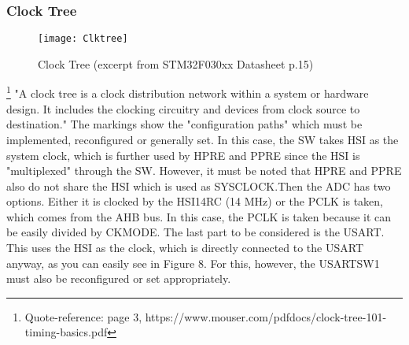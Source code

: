 \documentclass[11pt]{scrartcl}
\begin{document}
	\subsubsection{Clock Tree}
\begin{figure}[h]
		\centering
		\texttt{[image: Clktree]}
		\caption{Clock Tree (excerpt from STM32F030xx Datasheet p.15)}
\end{figure}	
\footnote{\label{foot:13}Quote-reference: page 3, https://www.mouser.com/pdfdocs/clock-tree-101-timing-basics.pdf} "A clock tree is a clock distribution network within a system or hardware design. It
includes the clocking circuitry and devices from clock source to destination." 
\newline\newline
The markings show the "configuration paths" which must be implemented, reconfigured or generally set. In this case, the SW takes HSI as the system clock, which is further used by HPRE and PPRE since the HSI is "multiplexed" through the SW. However, it must be noted that HPRE and PPRE also do not share the HSI which is used as SYSCLOCK.Then the ADC has two options. Either it is clocked by the HSI14RC (14 MHz) or the PCLK is taken, which comes from the AHB bus. In this case, the PCLK is taken because it can be easily divided by CKMODE. The last part to be considered is the USART. This uses the HSI as the clock, which is directly connected to the USART anyway, as you can easily see in Figure 8. For this, however, the USARTSW1 must also be reconfigured or set appropriately.



\newpage
\end{document}
